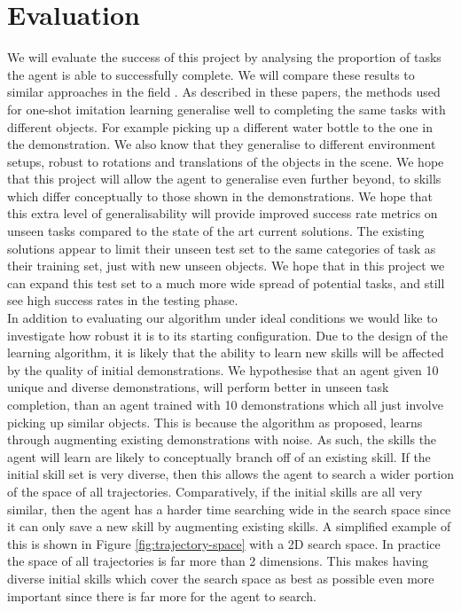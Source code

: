 \chapter{Evaluation}
\label{chap:evaluation}
We will evaluate the success of this project by analysing the proportion of tasks the agent is able to successfully complete. We will compare these results to similar approaches in the field \cite{one-shot-imitation, one-shot-pose-estimate}.
As described in these papers, the methods used for one-shot imitation learning generalise well to completing the same tasks with different objects. For example picking up a different water bottle to the one in the demonstration. We also know that they generalise to different environment setups, robust to rotations and translations of the objects in the scene. We hope that this project will allow the agent to generalise even further beyond, to skills which differ conceptually to those shown in the demonstrations. We hope that this extra level of generalisability will provide improved success rate metrics on unseen tasks compared to the state of the art current solutions. The existing solutions appear to limit their unseen test set to the same categories of task as their training set, just with new unseen objects. We hope that in this project we can expand this test set to a much more wide spread of potential tasks, and still see high success rates in the testing phase.\\

In addition to evaluating our algorithm under ideal conditions we would like to investigate how robust it is to its starting configuration. Due to the design of the learning algorithm, it is likely that the ability to learn new skills will be affected by the quality of initial demonstrations. We hypothesise that an agent given 10 unique and diverse demonstrations, will perform better in unseen task completion, than an agent trained with 10 demonstrations which all just involve picking up similar objects. This is because the algorithm as proposed, learns through augmenting existing demonstrations with noise. As such, the skills the agent will learn are likely to conceptually branch off of an existing skill. If the initial skill set is very diverse, then this allows the agent to search a wider portion of the space of all trajectories. Comparatively, if the initial skills are all very similar, then the agent has a harder time searching wide in the search space since it can only save a new skill by augmenting existing skills. A simplified example of this is shown in Figure \ref{fig:trajectory-space} with a 2D search space. In practice the space of all trajectories is far more than 2 dimensions. This makes having diverse initial skills which cover the search space as best as possible even more important since there is far more for the agent to search.

